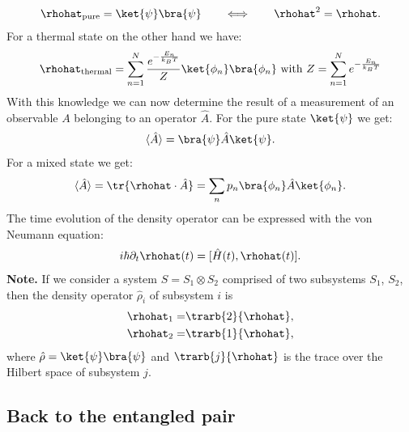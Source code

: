 \begin{align}
	\rhohat_{\text{pure}} = \ket{\psi}\bra{\psi} \qquad \Longleftrightarrow \qquad \rhohat^2 = \rhohat.
\end{align}
For a thermal state on the other hand we have:
\begin{align}
	\rhohat_{\text{thermal}} = \sum_{n=1}^N \frac{e^{-\frac{E_n}{k_BT}}}{Z} \ket{\phi_n}\bra{\phi_n}\text{ with }Z = \sum_{n=1}^N e^{-\frac{E_n}{k_BT}}
\end{align}
With this knowledge we can now determine the result of a measurement of an observable $A$ belonging to an operator $\hat{A}$. For the pure state $\ket{\psi}$ we get:
%
\begin{align}
				\langle \hat{A}\rangle = \bra{\psi} \hat{A} \ket{\psi}.
\end{align}
For a mixed state we get:
\begin{align}
	\langle \hat{A}\rangle = \tr{\rhohat \cdot \hat{A}} = \sum_n {p_n} \bra{\phi_n} \hat{A} \ket{\phi_n}.
\end{align}
The time evolution of the density operator can be expressed with the von Neumann equation:
\begin{align}
	i\hbar \partial_{t}\rhohat(t) = [\hat{H}(t),\rhohat(t)].
\end{align}
\textbf{Note.} 
If we consider a system $S = S_1 \otimes S_2$ comprised of two subsystems $S_1$, $S_2$, then the density operator $\hat{\rho}_i$ of  subsystem $i$ is
					\begin{align}
						\rhohat_1=&\trarb{2}{\rhohat},\\
						\rhohat_2=&\trarb{1}{\rhohat},
					\end{align}
					where $\hat{\rho}=\ket{\psi}\bra{\psi}$ and $\trarb{j}{\rhohat}$ is the trace over the Hilbert space of subsystem $j$.
\subsection{Back to the entangled pair}
